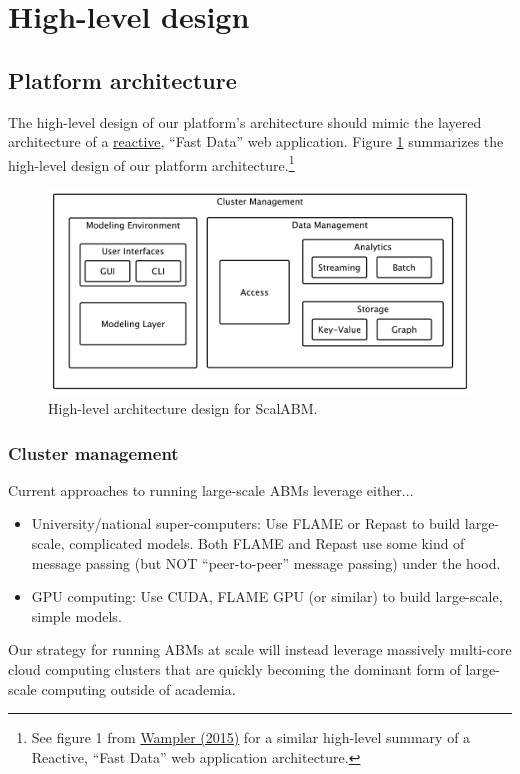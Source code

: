 \documentclass[11pt]{amsart}
\begin{document}
\section{High-level design}

\subsection{Platform architecture}
The high-level design of our platform's architecture should mimic the layered architecture of a \href{http://www.reactivemanifesto.org/}{reactive}, ``Fast Data'' web application. Figure \ref{img-figure1} summarizes the high-level design of our platform architecture.\footnote{
%
See figure 1 from \href{./fast-data-big-data-evolved.pdf}{Wampler (2015)} for a similar high-level summary of a Reactive, ``Fast Data'' web application architecture.
%
}
\begin{figure}[H]\label{img-figure1}
\centering
\includegraphics[width=12cm]{img/coarse-grain-schema.pdf}
\caption{High-level architecture design for ScalABM.}
\end{figure}

\subsubsection{Cluster management} 
Current approaches to running large-scale ABMs leverage either...
\begin{itemize}
    \item University/national super-computers: Use FLAME or Repast to build large-scale, complicated models. Both FLAME and Repast use some kind of message passing (but NOT ``peer-to-peer'' message passing) under the hood.
    \item GPU computing: Use CUDA, FLAME GPU (or similar) to build large-scale, simple models.
\end{itemize}
Our strategy for running ABMs at scale will instead leverage massively multi-core cloud computing clusters that are quickly becoming the dominant form of large-scale computing outside of academia.
\end{document}
